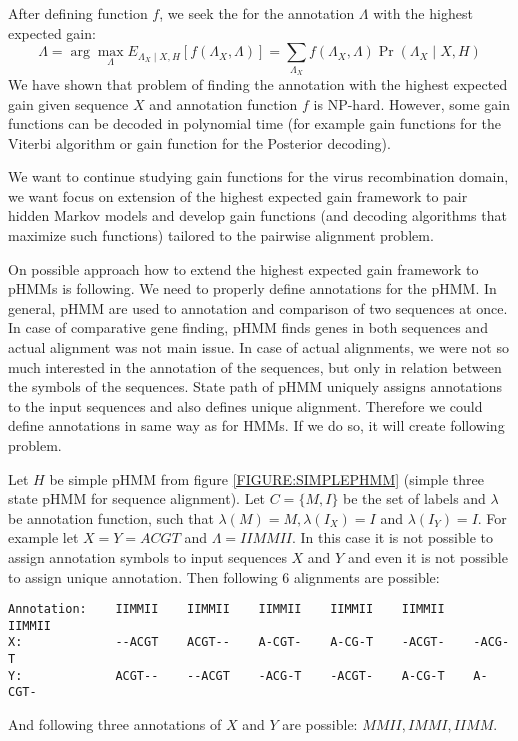 After defining function $f$, we seek the for the annotation $\Lambda$ with the highest expected gain:
\[\Lambda = \arg\max_{\Lambda} 
E_{\Lambda_X\mid X,H}[f(\Lambda_X,\Lambda)] =
\sum_{\Lambda_X}f(\Lambda_X,\Lambda)\Pr\left(\Lambda_X\mid X,H\right)
\]
We have shown that problem of finding the annotation with the highest expected
gain given sequence $X$ and annotation function $f$ is NP-hard. However, some gain
functions can be decoded in polynomial time (for example gain functions for the
Viterbi algorithm or gain function for  the Posterior decoding).

We want to continue studying gain functions for the virus recombination
domain, we want focus on extension of the highest expected gain framework to
pair hidden Markov models and develop gain functions (and decoding algorithms
that maximize such functions) tailored to the pairwise alignment problem. 

On possible approach how to extend the highest expected gain framework to pHMMs
is following.  We need to properly define annotations for the pHMM. In general,
pHMM are used to annotation and comparison of two sequences at once. In case of
comparative gene finding, pHMM finds genes in both sequences and actual
alignment was not main issue. In case of actual alignments, we were not so much
interested in the annotation of the sequences, but only in relation between the
symbols of the sequences. State path of pHMM uniquely assigns annotations to the
input sequences and also defines unique alignment.  Therefore we could define
annotations in same way as for HMMs. If we do so, it will create following
problem.

Let $H$ be simple pHMM from figure \ref{FIGURE:SIMPLEPHMM} (simple three state
pHMM for sequence alignment). Let $C=\{M,I\}$ be the set of labels and 
$\lambda$ be annotation function, such that $\lambda(M)=M, \lambda(I_X)=I$ and
$\lambda(I_Y)=I$.   For example let $X=Y=ACGT$ and $\Lambda = IIMMII$.
In this case it is not possible to assign annotation symbols
to input sequences $X$ and $Y$ and even it is not possible to assign unique
annotation.
Then
following $6$ alignments are possible:
\begin{verbatim}
Annotation:    IIMMII    IIMMII    IIMMII    IIMMII    IIMMII    IIMMII
X:             --ACGT    ACGT--    A-CGT-    A-CG-T    -ACGT-    -ACG-T
Y:             ACGT--    --ACGT    -ACG-T    -ACGT-    A-CG-T    A-CGT-
\end{verbatim}
And following three annotations of $X$ and $Y$ are possible: $MMII,IMMI,IIMM$.

